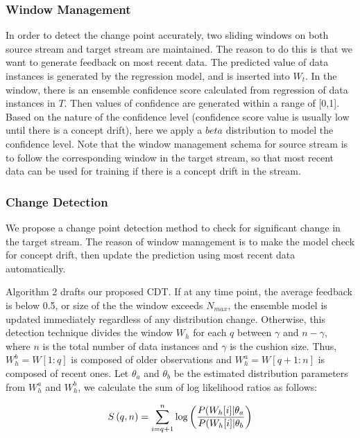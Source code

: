 \documentclass[conference,compsoc]{IEEEtran}
\begin{document}
\subsubsection{Window Management}
In order to detect the change point accurately, two
sliding windows on both source stream and target stream are
maintained. The reason to do this is that we want to generate
feedback on most recent data.
The predicted value of data instances is generated by the
regression model, and is inserted into $W_t$. In the window,
there is an ensemble confidence score calculated from regression of data instances in $T$. Then values of confidence are generated 
within a range of [0,1]. Based on the nature of the confidence
level (confidence score value is usually low until there 
is a concept drift), here we apply a $beta$ distribution to model the
confidence level. Note that the window management schema for source 
stream is to follow the corresponding window in the target stream, so 
that most recent data can be used for training if there is a 
concept drift in the stream.

\subsubsection{Change Detection}
We propose a change point detection method to check for
significant change in the target stream. The reason of window management is to make the model check for concept drift, then update the prediction using most recent data automatically.

Algorithm 2 drafts our proposed CDT. If at any time point, the average feedback is below 0.5, or size of the the window exceeds $N_{max}$, the ensemble model is updated immediately regardless of any distribution change. Otherwise, this detection technique divides the window $W_h$ for each $q$ between $\gamma$ and $n-\gamma$, where $n$ is the total number of data instances and $\gamma$ is the cushion size. Thus, $W_h^b = W[1:q]$ is composed of older observations and $W_h^a=W[q+1:n]$ is composed of recent ones. Let $\theta_{a}$ and $\theta_{b}$ be the estimated distribution parameters from $W_h^a$ and $W_h^b$, we calculate the sum of log likelihood ratios as follows:

\begin{equation} \label{eq1}
\begin{split}
S\left ( q,n \right ) = \sum_{i=q+1}^{n}\textup{log}\left ( \frac{P(W_h[i] | \theta_{a}}{P(W_h[i] | \theta_{b}}  \right ) 
\end{split}
\end{equation}
\end{document}
